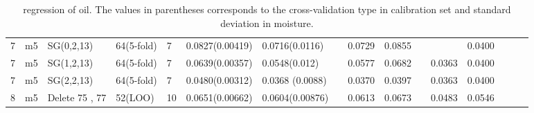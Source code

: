 \documentclass[a4paper,12pt,titlepage]{article} %
\numberwithin{equation}{section}  %
\begin{document}
\begin{landscape}
\begin{table}[]
\begin{tabular}{llllllllllllllll}
				7                    & m5                   & SG(0,2,13)           & 64(5-fold) & 7  & 0.0827(0.00419) & 0.0716(0.0116)  &   & 0.0729 & 0.0855 &   &        & 0.0400         &         &    &                 \\
				7                    & m5                   & SG(1,2,13)           & 64(5-fold) & 7  & 0.0639(0.00357) & 0.0548(0.012)   &   & 0.0577 & 0.0682 &   & 0.0363 & 0.0400         &         &    &                 \\
				7                    & m5                   & SG(2,2,13)           & 64(5-fold) & 7  & 0.0480(0.00312) & 0.0368 (0.0088) &   & 0.0370 & 0.0397 &   & 0.0363 & 0.0400         &         &    &                 \\
				8                    & m5                   & Delete 75 , 77       & 52(LOO)    & 10 & 0.0651(0.00662) & 0.0604(0.00876) &   & 0.0613 & 0.0673 &   & 0.0483 & 0.0546         &         &    &                 
			\end{tabular}
			
			\caption{regression of oil. The values in parentheses corresponds to the cross-validation type in calibration set and standard deviation in moisture.}
			\label{tab:oil}
		\end{table}


\end{landscape}
\end{document}
